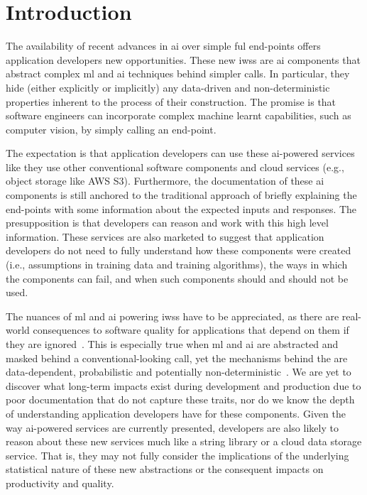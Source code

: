 
\section{Introduction}

The availability of recent advances in \gls{ai} over simple ful end-points offers application developers new opportunities. These new \glspl{iws} are \gls{ai} components that abstract complex \gls{ml} and \gls{ai} techniques behind simpler  calls. In particular, they hide (either explicitly or implicitly) any data-driven and non-deterministic properties inherent to the process of their construction. The promise is that software engineers can incorporate complex machine learnt capabilities, such as computer vision, by simply calling an  end-point.

The expectation is that application developers can use these \gls{ai}-powered services like they use other conventional software components and cloud services (e.g., object storage like AWS S3). Furthermore, the documentation of these \gls{ai} components is still anchored to the traditional approach of briefly explaining the end-points with some information about the expected inputs and responses. The presupposition is that developers can reason and work with this high level information. These services are also marketed to suggest that application developers do not need to fully understand how these components were created (i.e., assumptions in training data and training algorithms), the ways in which the components can fail, and when such components should and should not be used.

The nuances of \gls{ml} and \gls{ai} powering \glspl{iws} have to be appreciated, as there are real-world consequences to software quality for applications that depend on them if they are ignored~\citep{Cummaudo:2019icsme}. This is especially true when \gls{ml} and \gls{ai} are abstracted and masked behind a conventional-looking  call, yet the mechanisms behind the  are data-dependent, probabilistic and potentially non-deterministic~\citep{Ohtake:2019vi}. We are yet to discover what long-term impacts exist during development and production due to poor documentation that do not capture these traits, nor do we know the depth of understanding application developers have for these components. Given the way \gls{ai}-powered services are currently presented, developers are also likely to reason about these new services much like a string library or a cloud data storage service. That is, they may not fully consider the implications of the underlying statistical nature of these new abstractions or the consequent impacts on productivity and quality.

